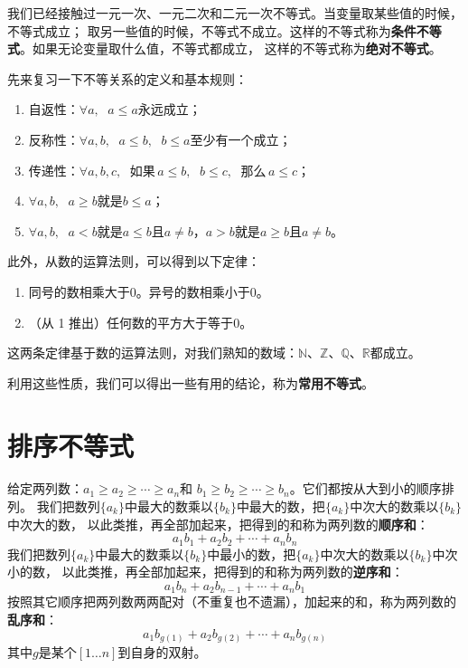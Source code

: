 \documentclass[12pt,UTF8]{ctexbook}
\begin{document}
我们已经接触过一元一次、一元二次和二元一次不等式。当变量取某些值的时候，不等式成立；
取另一些值的时候，不等式不成立。这样的不等式称为\textbf{条件不等式}。如果无论变量取什么值，不等式都成立，
这样的不等式称为\textbf{绝对不等式}。

先来复习一下不等关系的定义和基本规则：
\begin{enumerate}
    \item 自返性：$\forall a, \;\,\, a \leqslant a$永远成立；
    \item 反称性：$\forall a, b, \;\,\, a \leqslant b, \;\,\, b \leqslant a$至少有一个成立；
    \item 传递性：$\forall a, b, c, \;\,\, \mbox{如果}\, a \leqslant b, \;\,\, b \leqslant c, \;\,\, \mbox{那么}\, a \leqslant c$；
    \item $\forall a, b, \;\,\, a \geqslant b$就是$b \leqslant a$；
    \item $\forall a, b, \;\,\, a < b$就是$a \leqslant b$且$a \neq b$，$ a > b$就是$a \geqslant b$且$a \neq b$。
\end{enumerate}
此外，从数的运算法则，可以得到以下定律：
\begin{enumerate}
    \item 同号的数相乘大于$0$。异号的数相乘小于$0$。
    \item （从 1 推出）任何数的平方大于等于$0$。
\end{enumerate}
这两条定律基于数的运算法则，对我们熟知的数域：$\mathbb{N}$、$\mathbb{Z}$、$\mathbb{Q}$、$\mathbb{R}$都成立。

利用这些性质，我们可以得出一些有用的结论，称为\textbf{常用不等式}。

\section{排序不等式}

给定两列数：$a_1 \geqslant a_2 \geqslant \cdots \geqslant a_n$和
$b_1 \geqslant b_2 \geqslant \cdots \geqslant b_n$。它们都按从大到小的顺序排列。
我们把数列$\{a_k\}$中最大的数乘以$\{b_k\}$中最大的数，把$\{a_k\}$中次大的数乘以$\{b_k\}$中次大的数，
以此类推，再全部加起来，把得到的和称为两列数的\textbf{顺序和}：
$$ a_1b_1 + a_2b_2 + \cdots + a_nb_n $$
我们把数列$\{a_k\}$中最大的数乘以$\{b_k\}$中最小的数，把$\{a_k\}$中次大的数乘以$\{b_k\}$中次小的数，
以此类推，再全部加起来，把得到的和称为两列数的\textbf{逆序和}：
$$ a_1b_n + a_2b_{n-1} + \cdots + a_nb_1 $$
按照其它顺序把两列数两两配对（不重复也不遗漏），加起来的和，称为两列数的\textbf{乱序和}：
$$ a_1b_{g(1)} + a_2b_{g(2)} + \cdots + a_nb_{g(n)} $$
其中$g$是某个$[1\dots n]$到自身的双射。
\end{document}
